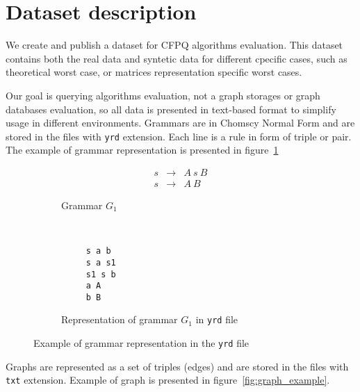 \section{Dataset description}

We create and publish a dataset for CFPQ algorithms evaluation.
This dataset contains both the real data and syntetic data for different cpecific cases, such as theoretical worst case, or matrices representation specific worst cases.

Our goal is querying algorithms evaluation, not a graph storages or graph databases evaluation, so all data is presented in text-based format to simplify usage in different environments.
Grammars are in Chomscy Normal Form and are stored in the files with \verb|yrd| extension.
Each line is a rule in form of triple or pair. 
The example of grammar representation is presented in figure~\ref{fig:grammar_example}


\begin{figure}[h]
    \centering
    \begin{subfigure}[b]{0.24\textwidth}
        \centering
        \[
         \begin{array}{rcl}
           s & \rightarrow & A \ s \ B \\
           s & \rightarrow & A \ B 
         \end{array}        
         \]
        \caption{Grammar $G_1$}
    \end{subfigure}%
    ~ 
    \begin{subfigure}[b]{0.24\textwidth}
        \centering
        \begin{verbatim}
     s a b
     s a s1
     s1 s b
     a A
     b B
        \end{verbatim}
        \caption{Representation of grammar $G_1$ in \texttt{yrd} file}
    \end{subfigure}
    \caption{Example of grammar representation in the \texttt{yrd} file}
    \label{fig:grammar_example}
\end{figure}



Graphs are represented as a set of triples (edges) and are stored in the files with \verb|txt| extension. 
Example of graph is presented in figure~\ref{fig:graph_example}.

